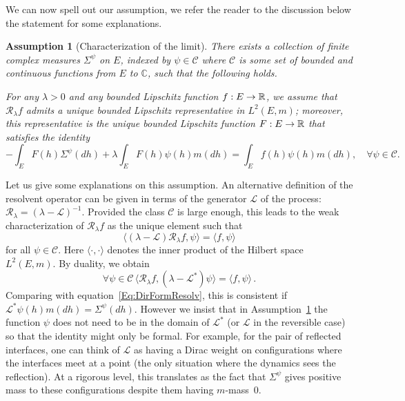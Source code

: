 \documentclass[10pt]{amsart}
\theoremstyle{definition}\newtheorem{defi}[theo]{Definition}\newtheorem{rema}[theo]{Remark}\newtheorem{exam}[theo]{Example}\newtheorem{exem}[theo]{Example}\newtheorem{nota}[theo]{Notation}
\theoremstyle{plain}
\newtheorem{assu}[theo]{Assumption}}
\newcommand{\cC}{\mathcal{C}}
\newcommand{\cL}{\mathcal{L}}
\newcommand{\cR}{\mathcal{R}}
\newcommand{\R}{\mathbb{R}}
\newcommand{\C}{\mathbb{C}}
\let\oldforall\forall
\renewcommand*{\forall}{\mathrel{\oldforall}}
\renewcommand*{\to}{\mathchoice{\longrightarrow}{\rightarrow}{\rightarrow}{\rightarrow}}
\begin{document}
We can now spell out our assumption, we refer the reader to the discussion below the statement for some explanations.

\begin{assu}[Characterization of the limit]\label{Ass:Charac}
There exists a collection of finite complex measures $\Sigma^{\psi}$ on $E$, indexed by $\psi \in \cC$ where $\cC$ is some set of bounded and continuous functions from $E$ to $\C$, such that the following holds.

For any $\lambda > 0$ and any bounded Lipschitz function $f:E\to \R$, we assume that $\cR_\lambda f$ admits a unique bounded Lipschitz representative in $L^2(E,m)$; moreover, this representative is the unique bounded Lipschitz function $F:E\to\R$ that satisfies the identity
\begin{equation}\label{Eq:DirFormResolv}
-\int_E F(h) \Sigma^{\psi}(dh) + \lambda \int_E F(h) \psi(h) m(dh) = \int_E f(h) \psi(h) m(dh),\quad \forall \psi \in \cC.
\end{equation}
\end{assu}

Let us give some explanations on this assumption. An alternative definition of the resolvent operator can be given in terms of the generator $\cL$ of the process: $\cR_\lambda = (\lambda - \cL)^{-1}$. Provided the class $\cC$ is large enough, this leads to the weak characterization of $\cR_\lambda f$ as the unique element such that
\[
\langle (\lambda - \cL) \cR_\lambda f, \psi \rangle = \langle f, \psi \rangle
\]
for all $\psi \in \cC$. Here $\langle \cdot,\cdot\rangle$ denotes the inner product of the Hilbert space $L^2(E,m)$. By duality, we obtain
\[
\forall \psi\in\cC \, \langle \cR_\lambda f, (\lambda - \cL^*)\psi \rangle = \langle f, \psi \rangle \,.
\]
Comparing with equation~\eqref{Eq:DirFormResolv}, this is consistent if $\cL^* \psi(h) m(dh) = \Sigma^\psi(dh)$. However we insist that in Assumption~\ref{Ass:Charac} the function $\psi$ does not need to be in the domain of $\cL^*$ (or $\cL$ in the reversible case) so that the identity might only be formal. For example, for the pair of reflected interfaces, one can think of $\cL$ as having a Dirac weight on configurations where the interfaces meet at a point (the only situation where the dynamics sees the reflection). At a rigorous level, this translates as the fact that $ \Sigma^{\psi}$ gives positive mass to these configurations despite them having $m$-mass~$0$.
\end{document}
